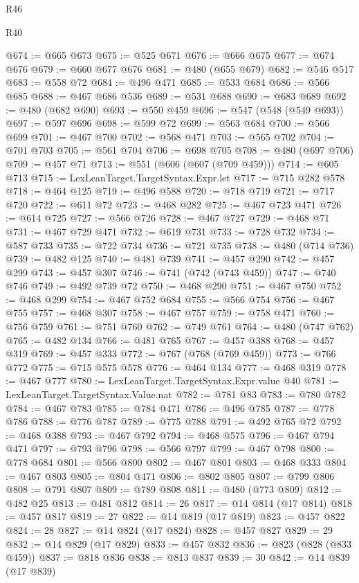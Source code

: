 \begin{lexlean}{R46}
\begin{lexlean}{R40}
\begin{coremodule}
{{{{{{{{{{{{{{{{{{{{{{{{{{{{{{{{{{{{{{{{{{{{{{{{{{{{{{{{{{{{{{{{{{{{{{{{{{{{{{{{{{{{{{{{{{{{{{{{{{{{{{{{{{{{{@674 := @665 @673
@675 := @525 @671
@676 := @666 @675
@677 := @674 @676
@679 := @660 @677 @676
@681 := @480 (@655 @679)
@682 := @546 @517
@683 := @558 @72
@684 := @496 @471
@685 := @533 @684
@686 := @566 @685
@688 := @467 @686 @536
@689 := @531 @688
@690 := @683 @689
@692 := @480 (@682 @690)
@693 := @550 @459
@696 := @547 (@548 (@549 @693))
@697 := @597 @696
@698 := @599 @72
@699 := @563 @684
@700 := @566 @699
@701 := @467 @700
@702 := @568 @471
@703 := @565 @702
@704 := @701 @703
@705 := @561 @704
@706 := @698 @705
@708 := @480 (@697 @706)
@709 := @457 @71
@713 := @551 (@606 (@607 (@709 @459)))
@714 := @605 @713
@715 := LexLeanTarget.TargetSyntax.Expr.let
@717 := @715 @282 @578
@718 := @464 @125
@719 := @496 @588
@720 := @718 @719
@721 := @717 @720
@722 := @611 @72
@723 := @468 @282
@725 := @467 @723 @471
@726 := @614 @725
@727 := @566 @726
@728 := @467 @727
@729 := @468 @71
@731 := @467 @729 @471
@732 := @619 @731
@733 := @728 @732
@734 := @587 @733
@735 := @722 @734
@736 := @721 @735
@738 := @480 (@714 @736)
@739 := @482 @125
@740 := @481 @739
@741 := @457 @290
@742 := @457 @299
@743 := @457 @307
@746 := @741 (@742 (@743 @459))
@747 := @740 @746
@749 := @492 @739 @72
@750 := @468 @290
@751 := @467 @750
@752 := @468 @299
@754 := @467 @752 @684
@755 := @566 @754
@756 := @467 @755
@757 := @468 @307
@758 := @467 @757
@759 := @758 @471
@760 := @756 @759
@761 := @751 @760
@762 := @749 @761
@764 := @480 (@747 @762)
@765 := @482 @134
@766 := @481 @765
@767 := @457 @388
@768 := @457 @319
@769 := @457 @333
@772 := @767 (@768 (@769 @459))
@773 := @766 @772
@775 := @715 @575 @578
@776 := @464 @134
@777 := @468 @319
@778 := @467 @777
@780 := LexLeanTarget.TargetSyntax.Expr.value @40
@781 := LexLeanTarget.TargetSyntax.Value.nat
@782 := @781 @83
@783 := @780 @782
@784 := @467 @783
@785 := @784 @471
@786 := @496 @785
@787 := @778 @786
@788 := @776 @787
@789 := @775 @788
@791 := @492 @765 @72
@792 := @468 @388
@793 := @467 @792
@794 := @468 @575
@796 := @467 @794 @471
@797 := @793 @796
@798 := @566 @797
@799 := @467 @798
@800 := @778 @684
@801 := @566 @800
@802 := @467 @801
@803 := @468 @333
@804 := @467 @803
@805 := @804 @471
@806 := @802 @805
@807 := @799 @806
@808 := @791 @807
@809 := @789 @808
@811 := @480 (@773 @809)
@812 := @482 @25
@813 := @481 @812
@814 := 26
@817 := @14 @814 (@17 @814)
@818 := @457 @817
@819 := 27
@822 := @14 @819 (@17 @819)
@823 := @457 @822
@824 := 28
@827 := @14 @824 (@17 @824)
@828 := @457 @827
@829 := 29
@832 := @14 @829 (@17 @829)
@833 := @457 @832
@836 := @823 (@828 (@833 @459))
@837 := @818 @836
@838 := @813 @837
@839 := 30
@842 := @14 @839 (@17 @839)
}}}}}}}}}}}}}}}}}}}}}}}}}}}}}}}}}}}}}}}}}}}}}}}}}}}}}}}}}}}}}}}}}}}}}}}}}}}}}}}}}}}}}}}}}}}}}}}}}}}}}}}}}}}}}
\end{coremodule}
\end{lexlean}
\end{lexlean}
